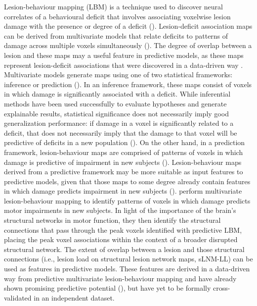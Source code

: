 \documentclass[phd,tocprelim]{cornell}
\begin{document}
Lesion-behaviour mapping (LBM) is a technique used to discover neural correlates of a behavioural deficit that involves associating voxelwise lesion damage with the presence or degree of a deficit (\cite{Bates2003-eg,Karnath2020-cg}). Lesion-deficit association maps can be derived from multivariate models that relate deficits to patterns of damage across multiple voxels simultaneously (\cite{Ivanova2021-nh, Karnath2020-cg, Zhang2014-jd, Sperber2019-tu}). The degree of overlap between a lesion and these maps may a useful feature in predictive models, as these maps represent lesion-deficit associations that were discovered in a data-driven way . Multivariate models generate maps using one of two statistical frameworks: inference or prediction (\cite{Sperber2022-oj, Bzdok2020-py}). In an inference framework, these maps consist of voxels in which damage is significantly associated with a deficit. While inferential methods have been used successfully to evaluate hypotheses and generate explainable results, statistical significance does not necessarily imply good generalization performance: if damage in a voxel is significantly related to a deficit, that does not necessarily imply that the damage to that voxel will be predictive of deficits in a new population (\cite{Bzdok2020-py}). On the other hand, in a prediction framework, lesion-behaviour maps are comprised of patterns of voxels in which damage is predictive of impairment in new subjects (\cite{Bowren2022-rs, Mah2014-cb,Rondina2017-ij, Sperber2020-kp}). Lesion-behaviour maps derived from a predictive framework may be more suitable as input features to predictive models, given that those maps to some degree already contain features in which damage predicts impairment in new subjects (\cite{Zhang2014-jd}). \cite{Bowren2022-rs} perform multivariate lesion-behaviour mapping to identify patterns of voxels in which damage predicts motor impairments in new subjects. In light of the importance of the brain's structural networks in motor function, they then identify the structural connections that pass through the peak voxels identified with predictive LBM,  placing the peak voxel associations within the context of a broader disrupted structural network. The extent of overlap between a lesion and those structural connections (i.e., lesion load on structural lesion network maps, sLNM-LL) can be used as features in predictive models. These features are derived in a data-driven way from predictive multivariate lesion-behaviour mapping and have already shown promising predictive potential (\cite{Bowren2022-rs}), but have yet to be formally cross-validated in an independent dataset. 
\end{document}
